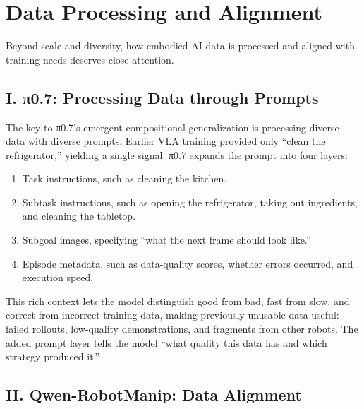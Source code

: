 \setcounter{section}{3}

\hypertarget{data-processing-and-alignment}{%
\section{Data Processing and Alignment}\label{data-processing-and-alignment}}

Beyond scale and diversity, how embodied AI data is processed and aligned with training needs deserves close attention.

\hypertarget{i.-ux3c00.7-processing-data-through-prompts}{%
\subsection{I. π0.7: Processing Data through Prompts}\label{i.-ux3c00.7-processing-data-through-prompts}}

The key to π0.7's emergent compositional generalization is processing diverse data with diverse prompts. Earlier VLA training provided only ``clean the refrigerator,'' yielding a single signal. π0.7 expands the prompt into four layers:

\begin{enumerate}
\def\labelenumi{\arabic{enumi}.}
\item
  Task instructions, such as cleaning the kitchen.
\item
  Subtask instructions, such as opening the refrigerator, taking out ingredients, and cleaning the tabletop.
\item
  Subgoal images, specifying ``what the next frame should look like.''
\item
  Episode metadata, such as data-quality scores, whether errors occurred, and execution speed.
\end{enumerate}

This rich context lets the model distinguish good from bad, fast from slow, and correct from incorrect training data, making previously unusable data useful: failed rollouts, low-quality demonstrations, and fragments from other robots. The added prompt layer tells the model ``what quality this data has and which strategy produced it.''

\hypertarget{ii.-qwen-robotmanip-data-alignment}{%
\subsection{II. Qwen-RobotManip: Data Alignment}\label{ii.-qwen-robotmanip-data-alignment}}

